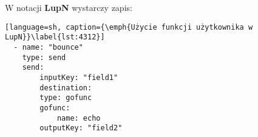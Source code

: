 W notacji \textbf{LupN} wystarczy zapis:

\begin{lstlisting}[language=sh, caption={\emph{Użycie funkcji użytkownika w LupN}}\label{lst:4312}]
  - name: "bounce"
    type: send
    send:
        inputKey: "field1"
        destination:
        type: gofunc
        gofunc:
            name: echo
        outputKey: "field2"
\end{lstlisting}